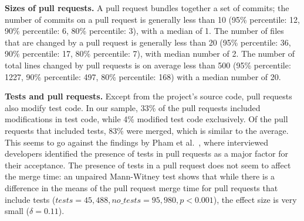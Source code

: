 \documentclass{sig-alternate}
\begin{document}
%

\textbf{Sizes of pull requests.}
A pull request bundles together a set of commits; the number of commits on a
pull request is generally less than 10 (95\% percentile: 12, 90\% percentile: 6,
80\% percentile: 3), with a median of 1. The number of files that are changed by
a pull request is generally less than 20 (95\% percentile: 36, 90\% percentile:
17, 80\% percentile: 7), with median number of 2. The number of total lines
changed by pull requests is on average less than 500 (95\% percentile: 1227,
90\% percentile: 497, 80\% percentile: 168) with a median number of 20.

\textbf{Tests and pull requests.} Except from the project's source code, pull
requests also modify test code. In our sample, 33\% of the pull requests
included modifications in test code, while 4\% modified test code exclusively.
Of the pull requests that included tests, 83\% were merged, which is similar to
the average. This seems to go against the findings by Pham et al.~\cite{Pham13},
where interviewed developers identified the presence of tests in pull requests
as a major factor for their acceptance. The presence of tests in
a pull request does not seem to affect the merge time: an unpaired Mann-Witney
test shows that while there is a difference in the means of the pull request
merge time for pull requests that include tests ($tests = 45,488, no\_tests =
95,980, p < 0.001$), the effect size is very small ($\delta = 0.11$).

\end{document}
